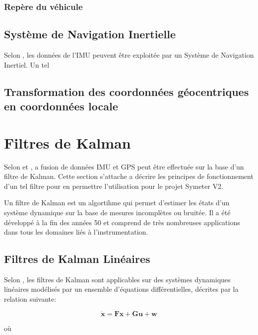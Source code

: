 \documentclass[12pt,a4paper]{report}
\begin{document}
	\subsubsection{Repère du véhicule}
	
				
	\subsection{Système de Navigation Inertielle}
	
	\para Selon \cite{gustavsson_uav_2015}, les données de l'IMU peuvent être exploitée par un Système de Navigation Inertiel. Un tel 
	
	
	\subsection{Transformation des coordonnées géocentriques en coordonnées locale}
	

	
	\section{Filtres de Kalman}
	
	Selon \cite{gustavsson_uav_2015} et \cite{menegatti_generalized_2016}, a fusion de données IMU et GPS peut être effectuée sur la base d'un filtre de Kalman. Cette section s'attache a décrire les principes de fonctionnement d'un tel filtre pour en permettre l'utilisation pour le projet Symeter V2.
	
	\para Un filtre de Kalman est un algortihme qui permet d'estimer les états d'un système dynamique sur la base  de mesures incomplètes ou bruitée. Il a été développé à la fin des années 50 et comprend de très nombreuses applications dans tous les domaines liés à l'instrumentation.
	
	\subsection{Filtres de Kalman Linéaires}
	Selon \cite{zarchan_fundamentals_2009}, les filtres de Kalman sont applicables sur des systèmes dynamiques linéaires modélisés par un ensemble d'équations différentielles, décrites par la relation suivante:
	
	\begin{equation}
		\label{eq:fullmodel}
	\boldsymbol{
		\dot{x} = Fx + Gu + w
	}
	\end{equation}
	
	\para où
\end{document}
